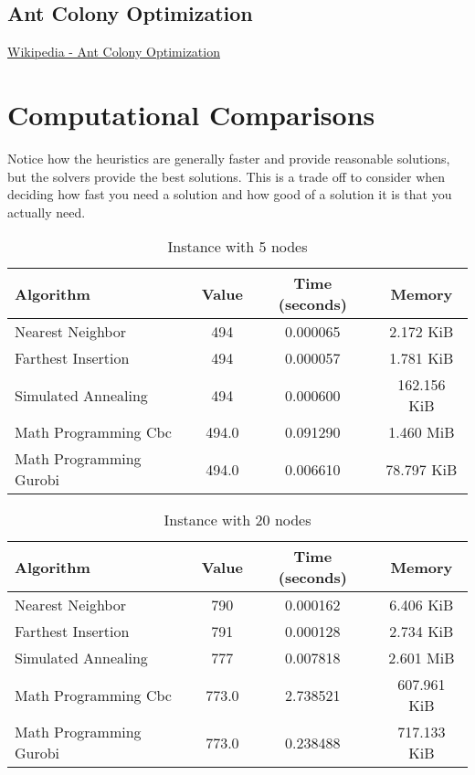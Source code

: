\subsection{Ant Colony Optimization}
\href{https://en.wikipedia.org/wiki/Ant_colony_optimization_algorithms}{Wikipedia - Ant Colony Optimization}

\section{Computational Comparisons}
Notice how the heuristics are generally faster and provide reasonable solutions, but the solvers provide the best solutions.  This is a trade off to consider when deciding how fast you need a solution and how good of a solution it is that you actually need.  


\begin{table}[h]
\centering
\caption{Instance with 5 nodes}
\begin{tabularx}{\linewidth}{l c c c}
\toprule
Algorithm & Value & Time (seconds) & Memory \\
\midrule
Nearest Neighbor & 494 & 0.000065 & 2.172 KiB \\
Farthest Insertion & 494 & 0.000057 & 1.781 KiB \\
Simulated Annealing & 494 & 0.000600 & 162.156 KiB \\
Math Programming Cbc & 494.0 & 0.091290 & 1.460 MiB \\
Math Programming Gurobi & 494.0 & 0.006610 & 78.797 KiB \\
\bottomrule
\end{tabularx}
\end{table}

\begin{table}[h]
\centering
\caption{Instance with 20 nodes}
\begin{tabularx}{\linewidth}{l c c c}
\toprule
Algorithm & Value & Time (seconds) & Memory \\
\midrule
Nearest Neighbor & 790 & 0.000162 & 6.406 KiB \\
Farthest Insertion & 791 & 0.000128 & 2.734 KiB \\
Simulated Annealing & 777 & 0.007818 & 2.601 MiB \\
Math Programming Cbc & 773.0 & 2.738521 & 607.961 KiB \\
Math Programming Gurobi & 773.0 & 0.238488 & 717.133 KiB \\
\bottomrule
\end{tabularx}
\end{table}

